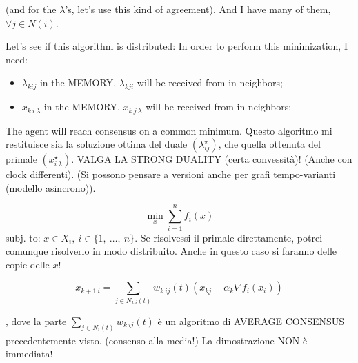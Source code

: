 (and for the $\lambda$'s, let's use this kind of agreement). And I have many of them, $\forall j\in N(i)$.

Let's see if this algorithm is distributed: In order to perform this minimization, I need:
\begin{itemize}
\item $\lambda_{kij}$ in the MEMORY, $\lambda_{kji}$ will be received from in-neighbors;
\item $x_{k\ i\ \lambda}$ in the MEMORY, $x_{k\ j\ \lambda}$ will be received from in-neighbors;
\end{itemize}

The agent will reach consensus on a common minimum. Questo algoritmo mi restituisce sia la soluzione ottima del duale $(\lambda_{ij}^\star)$, che quella ottenuta del primale $(x_{i\ \lambda}^\star)$.
VALGA LA STRONG DUALITY (certa convessità)! (Anche con clock differenti). (Si possono pensare a versioni anche per grafi tempo-varianti (modello asincrono)).

\[
	\min_x{\sum_{i=1}^n{f_i(x)}}
\]
subj. to: $x\in X_i,\ i\in\{1,\ \dots,\ n\}$. Se risolvessi il primale direttamente, potrei comunque risolverlo in modo distribuito. Anche in questo caso si faranno delle copie delle $x$!

\[
	x_{k+1\ i} = \sum_{j\in N_{k\ i}(t)}{w_{k\ ij}(t)(x_{kj} - \alpha_k\nabla{f_i(x_i)})}
\]

, dove la parte $\underline{\sum_{j\in N_i(t)}{w_{k\ ij}(t)}}$ è un algoritmo di AVERAGE CONSENSUS precedentemente visto. (consenso alla media!) La dimostrazione NON è immediata!